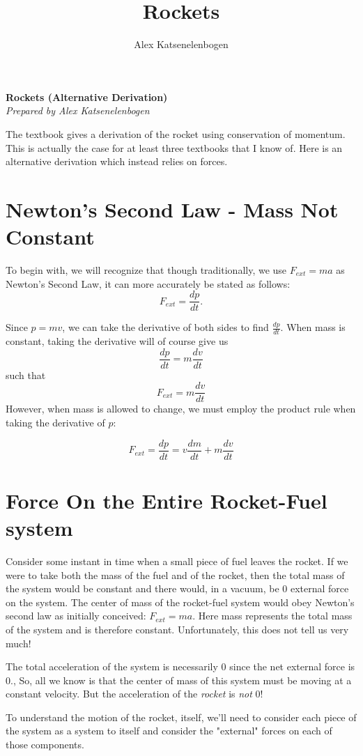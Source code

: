 \documentclass{article}
\title{Rockets}
\author{Alex Katsenelenbogen}
\begin{document}
\begin{center}
      \Large\textbf{Rockets (Alternative Derivation)}\\
      \large\textit{Prepared by Alex Katsenelenbogen}
   \end{center}
  
\newcommand{\dpdt}{\frac{dp}{dt}}
\newcommand{\dvdt}[1]{\frac{dv_{#1}}{dt}}
\newcommand{\dmdt}[1]{\frac{dm_{#1}}{dt}}
\newcommand{\frocketOnFuel}{F_{rocket\ on\ fuel}}
\newcommand{\ffuelOnRocket}{F_{fuel\ on\ rocket}}
\newcommand{\Fext}{F_{ext}}


\setlength{\parskip}{0.5em}
\setlength{\parindent}{1em}

The textbook gives a derivation of the rocket using conservation of momentum. This is actually the case for at least three textbooks that I know of.  Here is an alternative derivation which instead relies on forces. 
\section{Newton's Second Law - Mass Not Constant}
\par 
To begin with, we will recognize that though traditionally, we use $F_{ext}=ma$ as Newton's Second Law, it can more accurately be stated as follows:
$$\Fext = \dpdt.$$

Since $p=mv$, we can take the derivative of both sides to find $\dpdt$.
When mass is constant, taking the derivative will of course give us
$$\frac{dp}{dt} = m\frac{dv}{dt}$$ such that
$$\Fext = m\frac{dv}{dt}$$
However, when mass is allowed to change, we must employ the product rule when taking the derivative of $p$:

\begin{equation}
\Fext = \dpdt = v\frac{dm}{dt}+m\frac{dv}{dt}
\end{equation}
\par

\section{Force On the Entire Rocket-Fuel system}

Consider some instant in time when a small piece of fuel leaves the rocket. If we were to take both the mass of the fuel and of the rocket, then the total mass of the system would be constant and there would, in a vacuum, be 0 external force on the system. The center of mass of the rocket-fuel system would obey Newton's second law as initially conceived: $F_{ext}=ma$. Here mass  represents the total mass of the system and is therefore constant. Unfortunately, this does not tell us very much!\par
The total acceleration of the system is necessarily 0 since the net external force is 0., So, all we know is that the center of mass of this system must be moving at a constant velocity. But the acceleration of the \textit{rocket} is \textit{not} 0!\par
To understand the motion of the rocket, itself, we'll need to consider each piece of the system as a system to itself and consider the "external" forces on each of those components.
\end{document}
